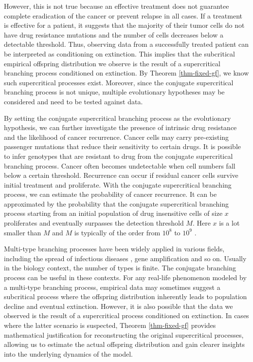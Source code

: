 \documentclass[11pt]{article}
\theoremstyle{plain}
\theoremstyle{definition}
\numberwithin{equation}{section}
\begin{document}
However, this is not true because an effective treatment does not guarantee complete eradication of the cancer or prevent relapse in all cases. 
If a treatment is effective for a patient, it suggests that the majority of their tumor cells do not have drug resistance mutations and the number of cells decreases below a detectable threshold. Thus, observing data from a successfully treated patient can be interpreted as conditioning on extinction.
This implies that the subcritical empirical offspring distribution we observe is the result of a supercritical branching process conditioned on extinction. By Theorem \ref{thm-fixed-gf}, we know such supercritical processes exist. 
Moreover, since the conjugate supercritical branching process is not unique, multiple evolutionary hypotheses may be considered and need to be tested against data.

By setting the conjugate supercritical branching process as the evolutionary hypothesis, we can further investigate the presence of intrinsic drug resistance and the likelihood of cancer recurrence.
Cancer cells may carry pre-existing passenger mutations that reduce their sensitivity to certain drugs. It is possible to infer genotypes that are resistant to drug from the conjugate supercritical branching process. 
Cancer often becomes undetectable when cell numbers fall below a certain threshold. Recurrence can occur if residual cancer cells survive initial treatment and proliferate. With the conjugate supercritical branching process, we can estimate the probability of cancer recurrence.
It can be approximated by the probability that the conjugate supercritical branching process starting from an initial population of drug insensitive cells of size $x$ proliferates and eventually surpasses the detection threshold $M$. Here $x$ is a lot smaller than $M$ and $M$ is typically of the order from $10^8$ to $10^9$ \cite{Del2009}.

Multi-type branching processes have been widely applied in various fields, including the spread of infectious diseases \cite{Jacob2010, Penisson2012}, gene amplification \cite{Harnevo1991}  and so on. Usually in the biology context, the number of types is finite. The conjugate branching process can be useful in these contexts. For any real-life phenomenon modeled by a multi-type branching process, empirical data may sometimes suggest a subcritical process where the offspring distribution inherently leads to population decline and eventual extinction. However, it is also possible that the data we observed is the result of a supercritical process conditioned on extinction. 
In cases where the latter scenario is suspected, Theorem \ref{thm-fixed-gf} provides mathematical justification for reconstructing the original supercritical processes, allowing us to estimate the actual offspring distribution and gain clearer insights into the underlying dynamics of the model.



%

\end{document}
